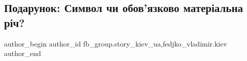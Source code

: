  
 
 
 
 
 
\subsection{Подарунок: Символ чи обов’язково матеріальна річ?}
\label{sec:07_12_2021.fb.fb_group.story_kiev_ua.1.podarok}
 
\ifcmt
 author_begin
   author_id fb_group.story_kiev_ua,fedjko_vladimir.kiev
 author_end
\fi
